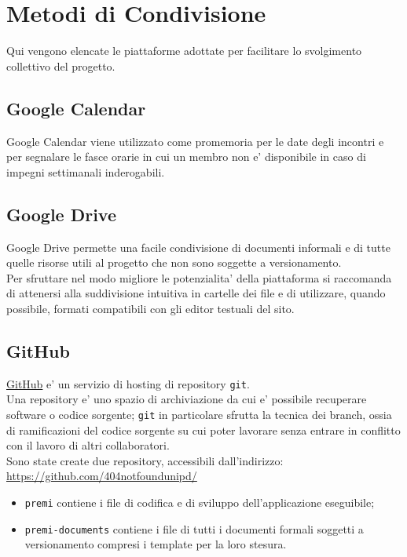\section{Metodi di Condivisione}
Qui vengono elencate le piattaforme adottate per facilitare lo svolgimento collettivo del progetto. \\
\subsection{Google Calendar}
Google Calendar viene utilizzato come promemoria per le date degli incontri e per segnalare le fasce orarie in cui un membro non e' disponibile in caso di impegni settimanali inderogabili. \\
\subsection{Google Drive}
Google Drive permette una facile condivisione di documenti informali e di tutte quelle risorse utili al progetto che non sono soggette a versionamento. \\
Per sfruttare nel modo migliore le potenzialita' della piattaforma si raccomanda di attenersi alla suddivisione intuitiva in cartelle dei file e di utilizzare, quando possibile, formati compatibili con gli editor testuali del sito.
\subsection{GitHub}
\href{http://www.github.com/}{GitHub} e' un servizio di hosting di repository \texttt{git}. \\
Una repository e' uno spazio di archiviazione da cui e' possibile recuperare software o codice sorgente; \texttt{git} in particolare sfrutta la tecnica dei branch, ossia di ramificazioni del codice sorgente su cui poter lavorare senza  entrare in conflitto con il lavoro di altri collaboratori.\\
Sono state create due repository, accessibili dall'indirizzo:\\ 
\url{https://github.com/404notfoundunipd/}
\begin{itemize}
\item \texttt{premi} contiene i file di codifica e di sviluppo dell'applicazione eseguibile;
\item \texttt{premi-documents} contiene i file di tutti i documenti formali soggetti a versionamento compresi i template per la loro stesura.
\end{itemize}
